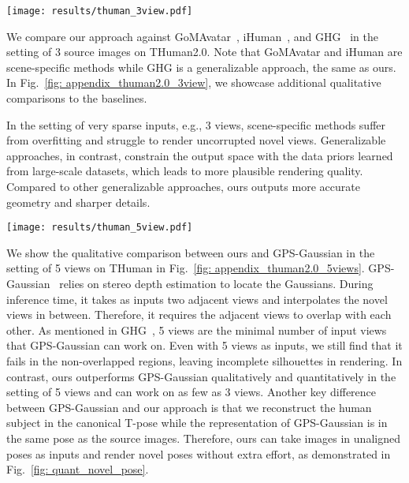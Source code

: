 \begin{figure*}[t]
    \centering
    \texttt{[image: results/thuman\_3view.pdf]}
    \vspace{-8mm}
    \caption{\textbf{Comparison to baselines in the setting of 3 source images on THuman2.0.} 
    Our method produces less noise than iHuman and GoMAvatar, and more accurate geometry and sharper details than GHG.}
    \label{fig: appendix_thuman2.0_3view}
\end{figure*}

We compare our approach against GoMAvatar~\citep{wen2024gomavatar}, iHuman~\citep{paudel2024ihuman}, and GHG~\citep{kwon2024ghg} in the setting of 3 source images on THuman2.0. Note that GoMAvatar and iHuman are scene-specific methods while GHG is a generalizable approach, the same as ours. In Fig.~\ref{fig: appendix_thuman2.0_3view}, we showcase additional qualitative comparisons to the baselines.

In the setting of very sparse inputs, e.g., 3 views, scene-specific methods suffer from overfitting and struggle to render uncorrupted novel views. Generalizable approaches, in contrast, constrain the output space with the data priors learned from large-scale datasets, which leads to more plausible rendering quality. Compared to other generalizable approaches, ours outputs more accurate geometry and sharper details.

\begin{figure*}[t]
    \centering
    \texttt{[image: results/thuman\_5view.pdf]}
    \vspace{-8mm}
    \caption{\textbf{Comparison to GPS-Gaussian in the setting of 5 source images on THuman2.0.} 
    Our method produces more complete shape and sharper details.}
    \label{fig: appendix_thuman2.0_5views}
\end{figure*}

We show the qualitative comparison between ours and GPS-Gaussian in the setting of 5 views on THuman in Fig.~\ref{fig: appendix_thuman2.0_5views}. GPS-Gaussian~\citep{zheng2024gpsgaussian} relies on stereo depth estimation to locate the Gaussians. During inference time, it takes as inputs two adjacent views and interpolates the novel views in between. Therefore, it requires the adjacent views to overlap with each other. As mentioned in GHG~\citep{kwon2024ghg}, 5 views are the minimal number of input views that GPS-Gaussian can work on. Even with 5 views as inputs, we still find that it fails in the non-overlapped regions, leaving incomplete silhouettes in rendering. In contrast, ours outperforms GPS-Gaussian qualitatively and quantitatively in the setting of 5 views and can work on as few as 3 views. Another key difference between GPS-Gaussian and our approach is that we reconstruct the human subject in the canonical T-pose while the representation of GPS-Gaussian is in the same pose as the source images. Therefore, ours can take images in unaligned poses as inputs and render novel poses without extra effort, as demonstrated in Fig.~\ref{fig: quant_novel_pose}.

